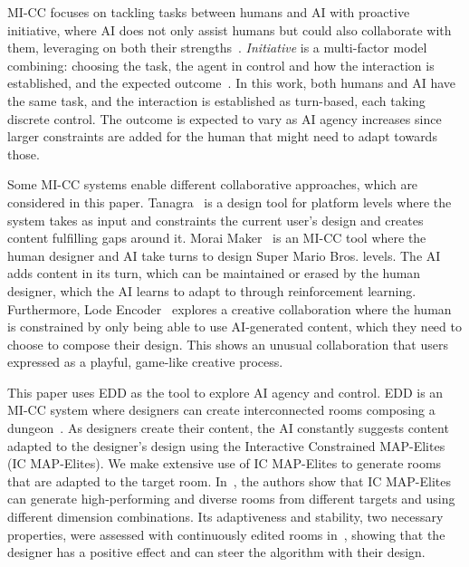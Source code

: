 MI-CC focuses on tackling tasks between humans and AI with proactive initiative, where AI does not only assist humans but could also collaborate with them, leveraging on both their strengths~. \emph{Initiative} is a multi-factor model combining: choosing the task, the agent in control and how the interaction is established, and the expected outcome~. In this work, both humans and AI have the same task, and the interaction is established as turn-based, each taking discrete control. The outcome is expected to vary as AI agency increases since larger constraints are added for the human that might need to adapt towards those. 

Some MI-CC systems enable different collaborative approaches, which are considered in this paper. Tanagra~ is a design tool for platform levels where the system takes as input and constraints the current user's design and creates content fulfilling gaps around it. Morai Maker~ is an MI-CC tool where the human designer and AI take turns to design Super Mario Bros. levels. The AI adds content in its turn, which can be maintained or erased by the human designer, which the AI learns to adapt to through reinforcement learning. Furthermore, Lode Encoder~ explores a creative collaboration where the human is constrained by only being able to use AI-generated content, which they need to choose to compose their design. This shows an unusual collaboration that users expressed as a playful, game-like creative process.



This paper uses EDD as the tool to explore AI agency and control. EDD is an MI-CC system where designers can create interconnected rooms composing a dungeon~. As designers create their content, the AI constantly suggests content adapted to the designer's design using the Interactive Constrained MAP-Elites (IC MAP-Elites). We make extensive use of IC MAP-Elites to generate rooms that are adapted to the target room. In~, the authors show that IC MAP-Elites can generate high-performing and diverse rooms from different targets and using different dimension combinations. Its adaptiveness and stability, two necessary properties, were assessed with continuously edited rooms in~, showing that the designer has a positive effect and can steer the algorithm with their design.

